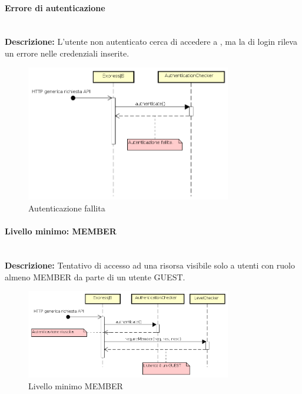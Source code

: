 \paragraph{Errore di autenticazione}  \mbox{} \\
\textbf{Descrizione:} L'utente non autenticato cerca di accedere a , ma la  di login rileva un errore nelle credenziali inserite.
\begin{figure}[H]
\centering
\includegraphics[width=0.8\textwidth]{res/sections/backend/sequence/autenticazioneFallita.png}
\caption{Autenticazione fallita}
\end{figure}
\paragraph{Livello minimo: MEMBER} \mbox{} \\
\textbf{Descrizione:} Tentativo di accesso ad una risorsa visibile solo a utenti con ruolo almeno MEMBER da parte di un utente GUEST.
\begin{figure}[H]
\centering
\includegraphics[width=0.8\textwidth]{res/sections/backend/sequence/requireMemberFallita.png}
\caption{Livello minimo MEMBER}
\end{figure}
